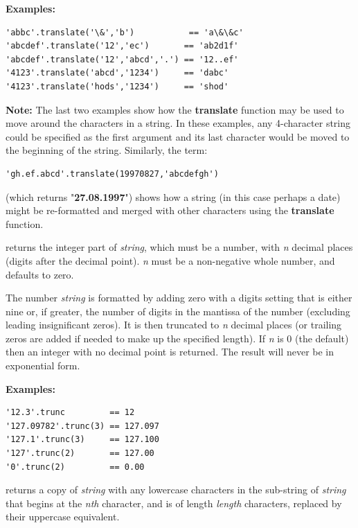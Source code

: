 \begin{description}
\textbf{Examples:}
\begin{lstlisting}
'abbc'.translate('\&','b')           == 'a\&\&c'
'abcdef'.translate('12','ec')       == 'ab2d1f'
'abcdef'.translate('12','abcd','.') == '12..ef'
'4123'.translate('abcd','1234')     == 'dabc'
'4123'.translate('hods','1234')     == 'shod'
\end{lstlisting}
\textbf{Note: }The last two examples show how the \textbf{translate} function
may be used to move around the characters in a string.
In these examples, any 4-character string could be specified as the
first argument and its last character would be moved to the beginning of
the string.
Similarly, the term:
\begin{lstlisting}
'gh.ef.abcd'.translate(19970827,'abcdefgh')
\end{lstlisting}
(which returns "\textbf{27.08.1997}") shows how a string (in
this case perhaps a date) might be re-formatted and merged with other
characters using the \textbf{translate} function.

\item[trunc([n{]})]\label{reftrunc}
returns the integer part of \emph{string}, which must be a
number, with \emph{n} decimal places (digits after the decimal
point).
\emph{n} must be a non-negative whole number, and defaults to zero.
 
The number \emph{string} is formatted by adding zero with a digits
setting that is either nine or, if greater, the number of digits in the
mantissa of the number (excluding leading insignificant zeros).
It is then truncated to \emph{n} decimal places (or trailing zeros
are added if needed to make up the specified length).
If \emph{n} is 0 (the default) then an integer with no decimal
point is returned.
The result will never be in exponential form.
 
\textbf{Examples:}
\begin{lstlisting}
'12.3'.trunc         == 12
'127.09782'.trunc(3) == 127.097
'127.1'.trunc(3)     == 127.100
'127'.trunc(2)       == 127.00
'0'.trunc(2)         == 0.00
\end{lstlisting}

\item[upper([n [,length{]]})]\label{refupper}
returns a copy of \emph{string} with any lowercase characters in
the sub-string of \emph{string} that begins at the \emph{n}\emph{th}
character, and is of length \emph{length} characters, replaced by
their uppercase equivalent.
 

\end{description}
